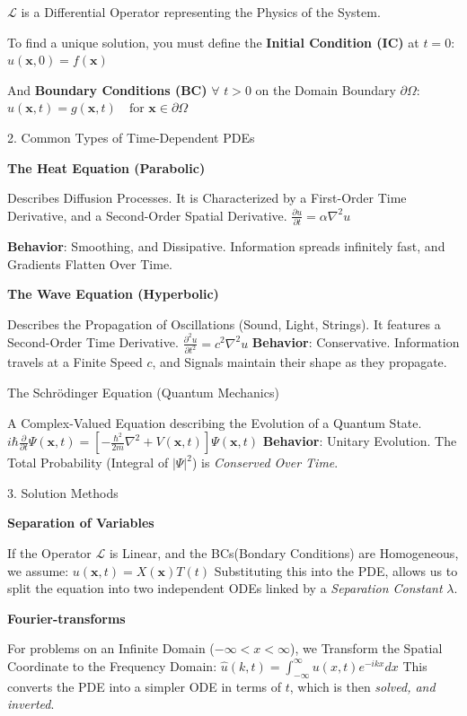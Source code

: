 \documentclass[a4paper, 10pt, onepage]{elegantbook}
\begin{document}
{ $\mathcal{L}$ is a Differential Operator representing the Physics of the System.  

To find a unique solution, you must define the \textbf{Initial Condition (IC)} at $t=0$:  
$ u(\mathbf{x}, 0) = f(\mathbf{x})$

And \textbf{Boundary Conditions (BC)} $\forall$ $t > 0$ on the Domain Boundary $\partial \Omega$:
$ u(\mathbf{x}, t) = g(\mathbf{x}, t) \quad \text{for } \mathbf{x} \in \partial \Omega $

2. Common Types of Time-Dependent PDEs  

   \textbf{The Heat Equation (Parabolic)}  

Describes Diffusion Processes. It is Characterized by a First-Order Time Derivative, and a Second-Order Spatial 
Derivative.  
$ \frac{\partial u}{\partial t} = \alpha \nabla^2 u $

\textbf{Behavior}: Smoothing, and Dissipative. Information spreads infinitely fast, and Gradients Flatten Over Time.  

     \textbf{The Wave Equation (Hyperbolic)}  

Describes the Propagation of Oscillations (Sound, Light, Strings). It features a Second-Order Time Derivative.
$\frac{\partial^2 u}{\partial t^2} = c^2 \nabla^2 u$
   \textbf{Behavior}: Conservative. Information travels at a Finite Speed $c$, and Signals maintain their shape as they 
propagate.

    The Schr\"odinger Equation (Quantum Mechanics)  

A Complex-Valued Equation describing the Evolution of a Quantum State.
$i\hbar \frac{\partial}{\partial t} \Psi(\mathbf{x}, t) = \left[ -\frac{\hbar^2}{2m} \nabla^2 + V(\mathbf{x}, t) 
\right] \Psi(\mathbf{x}, t)$
   \textbf{Behavior}: Unitary Evolution. The Total Probability (Integral of $|\Psi|^2$) is \emph{Conserved Over Time}.

3. Solution Methods  

    \textbf{Separation of Variables}  

If the Operator $\mathcal{L}$ is Linear, and the BCs(Bondary Conditions) are Homogeneous, we assume:
$u(\mathbf{x}, t) = X(\mathbf{x})T(t) $
Substituting this into the PDE, allows us to split the equation into two independent ODEs linked by a \emph{Separation 
Constant} $\lambda$.

     \textbf{Fourier-transforms}  

For problems on an Infinite Domain ($-\infty < x < \infty$), we Transform the Spatial Coordinate to the Frequency 
Domain:
$ \hat{u}(k, t) = \int_{-\infty}^{\infty} u(x, t) e^{-ikx} dx $
This converts the PDE into a simpler ODE in terms of $t$, which is then \emph{solved, and inverted}.  

}
\end{document}
